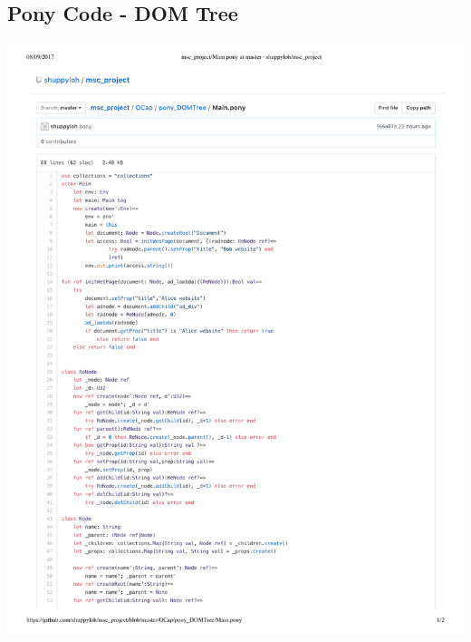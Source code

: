 \documentclass[a4paper,11pt,twoside]{article}
\begin{document}
{\subsection{Pony Code - DOM Tree}\label{sec:code_DOM}
\begin{minipage}{\textwidth}
\includegraphics[width=\textwidth,valign=t,page=1]{figures/code_DOM.pdf}
\end{minipage}
\begin{minipage}{\textwidth}

\end{minipage}}
\end{document}
